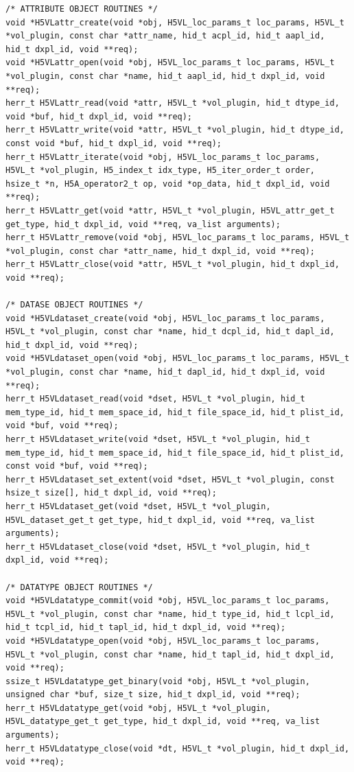 \begin{lstlisting}
/* ATTRIBUTE OBJECT ROUTINES */
void *H5VLattr_create(void *obj, H5VL_loc_params_t loc_params, H5VL_t *vol_plugin, const char *attr_name, hid_t acpl_id, hid_t aapl_id, hid_t dxpl_id, void **req);
void *H5VLattr_open(void *obj, H5VL_loc_params_t loc_params, H5VL_t *vol_plugin, const char *name, hid_t aapl_id, hid_t dxpl_id, void **req);
herr_t H5VLattr_read(void *attr, H5VL_t *vol_plugin, hid_t dtype_id, void *buf, hid_t dxpl_id, void **req);
herr_t H5VLattr_write(void *attr, H5VL_t *vol_plugin, hid_t dtype_id, const void *buf, hid_t dxpl_id, void **req);
herr_t H5VLattr_iterate(void *obj, H5VL_loc_params_t loc_params,
H5VL_t *vol_plugin, H5_index_t idx_type, H5_iter_order_t order,
hsize_t *n, H5A_operator2_t op, void *op_data, hid_t dxpl_id, void **req);
herr_t H5VLattr_get(void *attr, H5VL_t *vol_plugin, H5VL_attr_get_t get_type, hid_t dxpl_id, void **req, va_list arguments);
herr_t H5VLattr_remove(void *obj, H5VL_loc_params_t loc_params, H5VL_t
*vol_plugin, const char *attr_name, hid_t dxpl_id, void **req);
herr_t H5VLattr_close(void *attr, H5VL_t *vol_plugin, hid_t dxpl_id, void **req);

/* DATASE OBJECT ROUTINES */
void *H5VLdataset_create(void *obj, H5VL_loc_params_t loc_params,
H5VL_t *vol_plugin, const char *name, hid_t dcpl_id, hid_t dapl_id, hid_t dxpl_id, void **req);
void *H5VLdataset_open(void *obj, H5VL_loc_params_t loc_params, H5VL_t
*vol_plugin, const char *name, hid_t dapl_id, hid_t dxpl_id, void **req);
herr_t H5VLdataset_read(void *dset, H5VL_t *vol_plugin, hid_t
mem_type_id, hid_t mem_space_id, hid_t file_space_id, hid_t plist_id, void *buf, void **req);
herr_t H5VLdataset_write(void *dset, H5VL_t *vol_plugin, hid_t
mem_type_id, hid_t mem_space_id, hid_t file_space_id, hid_t plist_id, const void *buf, void **req);
herr_t H5VLdataset_set_extent(void *dset, H5VL_t *vol_plugin, const hsize_t size[], hid_t dxpl_id, void **req);
herr_t H5VLdataset_get(void *dset, H5VL_t *vol_plugin,
H5VL_dataset_get_t get_type, hid_t dxpl_id, void **req, va_list arguments);
herr_t H5VLdataset_close(void *dset, H5VL_t *vol_plugin, hid_t dxpl_id, void **req);

/* DATATYPE OBJECT ROUTINES */
void *H5VLdatatype_commit(void *obj, H5VL_loc_params_t loc_params, H5VL_t *vol_plugin, const char *name, hid_t type_id, hid_t lcpl_id, hid_t tcpl_id, hid_t tapl_id, hid_t dxpl_id, void **req);
void *H5VLdatatype_open(void *obj, H5VL_loc_params_t loc_params, H5VL_t *vol_plugin, const char *name, hid_t tapl_id, hid_t dxpl_id, void **req);
ssize_t H5VLdatatype_get_binary(void *obj, H5VL_t *vol_plugin, unsigned char *buf, size_t size, hid_t dxpl_id, void **req);
herr_t H5VLdatatype_get(void *obj, H5VL_t *vol_plugin, H5VL_datatype_get_t get_type, hid_t dxpl_id, void **req, va_list arguments);
herr_t H5VLdatatype_close(void *dt, H5VL_t *vol_plugin, hid_t dxpl_id,
void **req);


\end{lstlisting}
